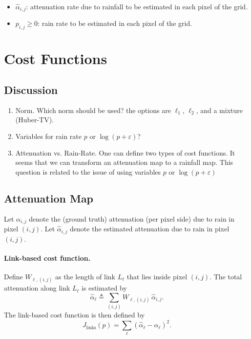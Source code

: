 \documentclass[12pt]{article}
\begin{document}
\begin{itemize}
    \item $
    \hat\alpha_{i,j}$: attenuation rate due to rainfall to be estimated in each pixel of the grid.
    \item $p_{i,j} \ge 0$: rain rate to be estimated in each pixel of the grid.
\end{itemize}

\section{Cost Functions}

\subsection{Discussion}

\begin{enumerate}
    \item Norm. Which norm should be used? the options are $\ell_1$, $\ell_2$, and a mixture (Huber-TV).
    
    \item Variables for rain rate $p$ or $\log (p+\varepsilon)$?
    
    \item Attenuation vs. Rain-Rate. One can define two types of cost functions. It seems that we can transform an attenuation map to a rainfall map. This question is related to the issue of using variables $p$ or $\log (p+\varepsilon)$

\end{enumerate}

\subsection{Attenuation Map}
\newcommand{\halpha}{\hat{\alpha}}

Let $\alpha_{i,j}$ denote the (ground truth) attenuation (per pixel side) due to rain in pixel $(i,j)$. 
Let $\halpha_{i,j}$ denote the estimated attenuation due to rain in pixel $(i,j)$. 


\paragraph{Link-based cost function.}
Define $W_{\ell,(i,j)}$ as the length of link $L_{\ell}$ that lies inside pixel $(i,j)$.
The total attenuation along link $L_{\ell}$ is estimated by
\[
\halpha_{\ell} \triangleq \sum_{(i,j)} W_{\ell,(i,j)} \, \halpha_{i,j}.
\]
The link-based cost function is then defined by 
\[
J_{\text{links}}(p)
= \sum_{\ell}
\left(
\halpha_{\ell}
- \alpha_{\ell}
\right)^{2}.
\]
\end{document}
